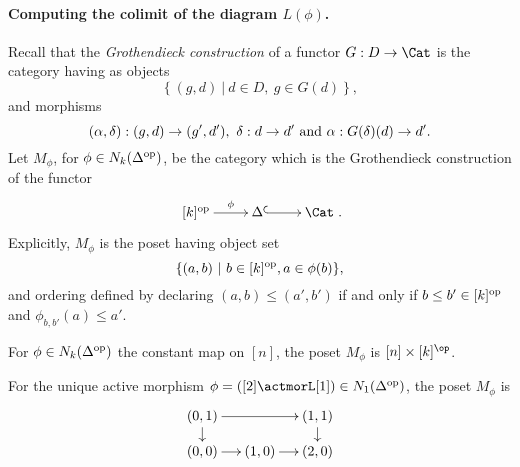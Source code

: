 \documentclass[a4paper]{article}
\numberwithin{equation}{section}
\begin{document}
\paragraph{Computing the colimit of the diagram $L(\phi)$.} Recall that the {\em Grothendieck construction} of a functor $G:D \to \Cat$ is the category having as objects
\begin{equation*}
 \left\{ (g, d) \ | \ d \in D, \ g \in G(d)\right\},
\end{equation*}
and morphisms
\begin{equation*}
 (\alpha,\delta):(g,d) \to (g',d'), \  \delta:d \to d' \ {\rm and} \ \alpha:G(\delta)(d) \to d'.
\end{equation*}
Let $M_\phi$, for $\phi\in N_k(\Delta^{\rm op})$, be the category which is the Grothendieck construction of the functor
\begin{equation*}
 \xymatrix{ [k]^{\rm op} \ar[r]^-\phi & \Delta \ar@{^{(}->}[r] & \Cat}.
\end{equation*}
Explicitly, $M_\phi$ is the poset having object set 
\begin{equation*}
 \{ (a,b) \ | \ b \in[k]^{\rm op}, a \in \phi(b)\},
\end{equation*}
and ordering defined by declaring $(a,b) \leq (a',b')$ if and only if $b \leq b' \in [k]^{\rm op}$ and $\phi_{b,b'}(a) \leq a'$. 
\begin{exam}
For $\phi \in N_k(\Delta^{\rm op})$ the constant map on $[n]$, the poset $M_\phi$ is  $[n]\times[k]^\op$.
\end{exam}
\begin{exam}
 For the unique active morphism $\phi = ([2] \actmorL [1]) \in N_1(\Delta^{\rm op})$, the poset $M_\phi$ is
\begin{equation*}
 \xymatrixrowsep{.8pc}\xymatrixcolsep{1.1pc} \xymatrix{(0,1) \ar[d] \ar[rr] & & (1,1) \ar[d] \\
 (0,0) \ar[r] & (1,0) \ar[r] & (2,0)}
\end{equation*}
\end{exam}
\end{document}
